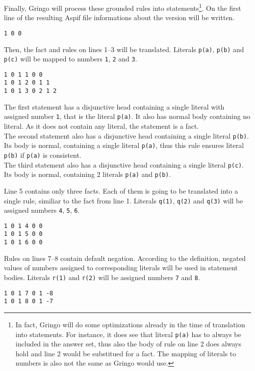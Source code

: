 \begin{example}
    Finally, Gringo will process these grounded rules into statements\footnote{
        In fact, Gringo will do some optimizations already in the time of
    translation into statements. For instance, it does see that literal \texttt{p(a)}
    has to always be included in the answer set, thus also the body of rule on line 2
    does always hold and line 2 would be substitued for a fact.
    The mapping of literals to numbers is also not the same as Gringo would use.}.
    On the first line of the resulting Aspif file informations about the version
    will be written.
    \begin{lstlisting}
1 0 0
\end{lstlisting}

    Then, the fact and rules on lines 1--3 will be translated. Literals
    \texttt{p(a)}, \texttt{p(b)} and \texttt{p(c)} will be mapped to numbers \texttt{1},
    \texttt{2} and \texttt{3}.
    \begin{lstlisting}[firstnumber=2]
1 0 1 1 0 0
1 0 1 2 0 1 1
1 0 1 3 0 2 1 2
\end{lstlisting}
    The first statement has a disjunctive head containing a single literal with assigned
    number \texttt{1}, that is the literal \texttt{p(a)}. It also has normal body
    containing no literal. As it does not contain any literal, the statement is a fact.\\
    The second statement also has a disjunctive head containing a single literal
    \texttt{p(b)}. Its body is normal, containing a single literal \texttt{p(a)},
    thus this rule ensures literal \texttt{p(b)} if \texttt{p(a)} is consistent.\\
    The third statement also has a disjunctive head containing a single literal
    \texttt{p(c)}. Its body is normal, containing 2 literals \texttt{p(a)} and \texttt{p(b)}.

    Line 5 contains only three facts. Each of them is going to be translated into a single
    rule, similiar to the fact from line 1. Literals \texttt{q(1)}, \texttt{q(2)} and \texttt{q(3)}
    will be assigned numbers \texttt{4}, \texttt{5}, \texttt{6}.
    \begin{lstlisting}[firstnumber=5]
1 0 1 4 0 0
1 0 1 5 0 0
1 0 1 6 0 0
\end{lstlisting}

    Rules on lines 7--8 contain default negation. According to the definition, negated values
    of numbers assigned to corresponding literals will be used in statement bodies.
    Literals \texttt{r(1)} and \texttt{r(2)} will be assigned numbers \texttt{7} and \texttt{8}.
    \begin{lstlisting}[firstnumber=8]
1 0 1 7 0 1 -8
1 0 1 8 0 1 -7
\end{lstlisting}


\end{example}
